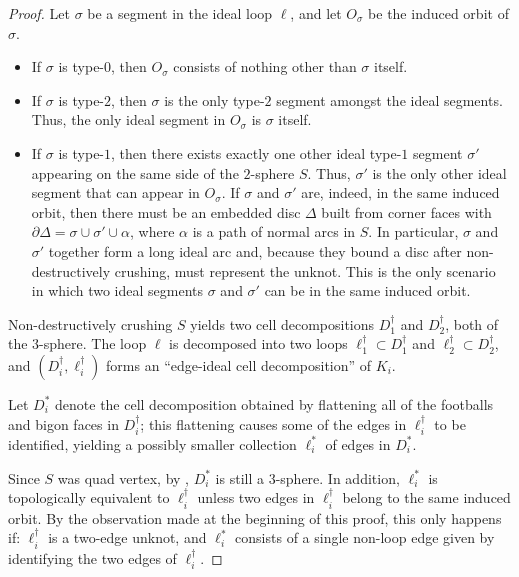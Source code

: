 \documentclass[a4paper,UKenglish,cleveref, autoref, thm-restate]{lipics-v2021}
\begin{document}
\begin{proof}
Let $\sigma$ be a segment in the ideal loop $\ell$, and let $O_\sigma$ be the induced orbit of $\sigma$.
\begin{itemize}
    \item If $\sigma$ is type-$0$, then $O_{\sigma}$ consists of nothing other than $\sigma$ itself.
    \item If $\sigma$ is type-$2$, then $\sigma$ is the
    only type-$2$ segment amongst the ideal segments.
    Thus, the only ideal segment in $O_{\sigma}$ is $\sigma$ itself.
    \item If $\sigma$ is type-$1$, then there exists exactly one other ideal type-$1$ segment $\sigma'$ appearing on the same side of the $2$-sphere $S$.
    Thus, $\sigma'$ is the only other ideal segment that can appear in $O_{\sigma}$. If $\sigma$ and $\sigma'$ are, indeed, in the same induced orbit, then there must be an embedded disc $\Delta$ built from corner faces with $\partial\Delta = \sigma \cup \sigma' \cup \alpha$, where $\alpha$ is a path of normal arcs in $S$. In particular, $\sigma$ and $\sigma'$ together form a long ideal arc and, because they bound a disc after non-destructively crushing, must represent the unknot. This is the only scenario in which two ideal segments $\sigma$ and $\sigma'$ can be in the same induced orbit.
\end{itemize}

Non-destructively crushing $S$ yields two cell decompositions $D_1^\dagger$ and $D_2^\dagger$, both of the $3$-sphere. The loop $\ell$ is decomposed into two loops $\ell_1^\dagger \subset D_1^\dagger$ and $\ell_2^\dagger \subset D_2^\dagger$,
and $(D_i^\dagger, \ell_i^\dagger)$ forms an ``edge-ideal cell decomposition'' of $K_i$.

Let $D_i^\ast$ denote the cell decomposition obtained by flattening all of the footballs and bigon faces in $D_i^\dagger$; this flattening causes some of the edges in $\ell_i^\dagger$ to be identified, yielding a possibly smaller collection $\ell_i^\ast$ of edges in $D_i^\ast$.

Since $S$ was quad vertex, by , $D_i^\ast$ is still a $3$-sphere. In addition, $\ell_i^\ast$ is topologically equivalent to $\ell_i^\dagger$ unless two edges in $\ell_i^\dagger$ belong to the same induced orbit.
By the observation made at the beginning of this proof, this only happens if: $\ell_i^\dagger$ is a two-edge unknot, and $\ell_i^\ast$ consists of a single non-loop edge given by identifying the two edges of $\ell_i^\dagger$.


\end{proof}
\end{document}
